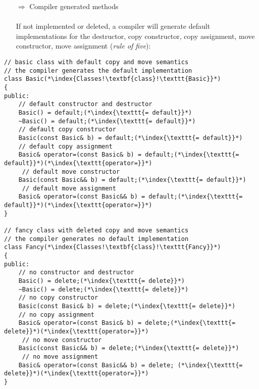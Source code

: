 \documentclass[10pt]{book}
\begin{document}
\begin{enumerate}
\item[$\Rightarrow$] Compiler generated methods \\ \\ If not implemented or deleted, a compiler will generate default implementations for the destructor, copy constructor, copy assignment, move constructor, move assignment (\emph{rule of five}):
\end{enumerate}
\begin{lstlisting}
// basic class with default copy and move semantics
// the compiler generates the default implementation
class Basic(*\index{Classes!\textbf{class}!\texttt{Basic}}*)
{
public:
    // default constructor and destructor
    Basic() = default;(*\index{\texttt{= default}}*)
    ~Basic() = default;(*\index{\texttt{= default}}*)
    // default copy constructor
    Basic(const Basic& b) = default;(*\index{\texttt{= default}}*)
    // default copy assignment
    Basic& operator=(const Basic& b) = default;(*\index{\texttt{= default}}*)(*\index{\texttt{operator=}}*)
     // default move constructor
    Basic(const Basic&& b) = default;(*\index{\texttt{= default}}*)
     // default move assignment
    Basic& operator=(const Basic&& b) = default;(*\index{\texttt{= default}}*)(*\index{\texttt{operator=}}*)
}

// fancy class with deleted copy and move semantics
// the compiler generates no default implementation
class Fancy(*\index{Classes!\textbf{class}!\texttt{Fancy}}*)
{
public:
    // no constructor and destructor
    Basic() = delete;(*\index{\texttt{= delete}}*)
    ~Basic() = delete;(*\index{\texttt{= delete}}*)
    // no copy constructor
    Basic(const Basic& b) = delete;(*\index{\texttt{= delete}}*)
    // no copy assignment
    Basic& operator=(const Basic& b) = delete;(*\index{\texttt{= delete}}*)(*\index{\texttt{operator=}}*)
     // no move constructor
    Basic(const Basic&& b) = delete;(*\index{\texttt{= delete}}*)
     // no move assignment
    Basic& operator=(const Basic&& b) = delete; (*\index{\texttt{= delete}}*)(*\index{\texttt{operator=}}*)
}
\end{lstlisting}

%
%
\end{document}
